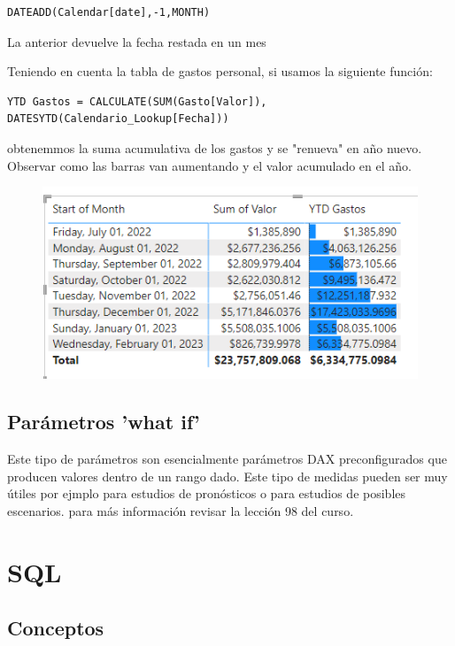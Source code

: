 \begin{verbatim}
DATEADD(Calendar[date],-1,MONTH)
\end{verbatim}

La anterior devuelve la fecha restada en un mes

Teniendo en cuenta la tabla de gastos personal, si usamos la siguiente función:

\begin{verbatim}
YTD Gastos = CALCULATE(SUM(Gasto[Valor]), DATESYTD(Calendario_Lookup[Fecha]))
\end{verbatim}

obtenemmos la suma acumulativa de los gastos y se "renueva" en año nuevo. Observar como las barras van aumentando y el valor acumulado en el año.

\begin{figure}[H]
    \centering
    \includegraphics{Data/datafig3.png}
\end{figure}

\subsection{Parámetros 'what if'}

Este tipo de parámetros son esencialmente parámetros DAX preconfigurados que producen valores dentro de un rango dado. Este tipo de medidas pueden ser muy útiles por ejmplo para estudios de pronósticos o para estudios de posibles escenarios. para más información revisar la lección 98 del curso.


\section{SQL}



    \subsection{Conceptos}

